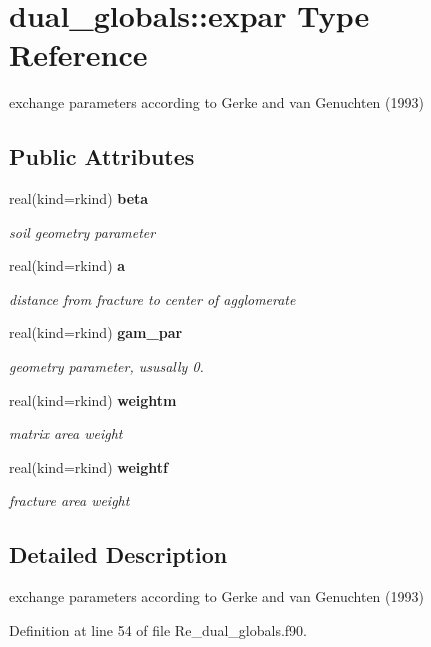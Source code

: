 \section{dual\+\_\+globals\+:\+:expar Type Reference}
\label{structdual__globals_1_1expar}


exchange parameters according to Gerke and van Genuchten (1993)  


\subsection*{Public Attributes}
\begin{DoxyCompactItemize}
\item 
real(kind=rkind) {\bf beta}
\begin{DoxyCompactList}\small\item\em soil geometry parameter \end{DoxyCompactList}\item 
real(kind=rkind) {\bf a}
\begin{DoxyCompactList}\small\item\em distance from fracture to center of agglomerate \end{DoxyCompactList}\item 
real(kind=rkind) {\bf gam\+\_\+par}
\begin{DoxyCompactList}\small\item\em geometry parameter, ususally 0. \end{DoxyCompactList}\item 
real(kind=rkind) {\bf weightm}
\begin{DoxyCompactList}\small\item\em matrix area weight \end{DoxyCompactList}\item 
real(kind=rkind) {\bf weightf}
\begin{DoxyCompactList}\small\item\em fracture area weight \end{DoxyCompactList}\end{DoxyCompactItemize}


\subsection{Detailed Description}
exchange parameters according to Gerke and van Genuchten (1993) 

Definition at line 54 of file Re\+\_\+dual\+\_\+globals.\+f90.



